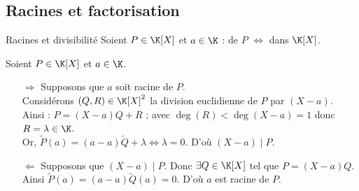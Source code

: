 \documentclass[12pt,a4paper]{report}
\begin{document}
    \subsection{Racines et factorisation}
    
        \begin{theoreme}{Racines et divisibilité}{}
        Soient $P \in \K[X]$ et $a \in \K$ : 
        \center {} de $P$ $\Leftrightarrow$  dans $\K[X]$.
        \end{theoreme}
    
        \begin{demo}
        Soient $P \in \K[X]$ et $a \in \K$.
        \begin{itemize}
            \item[$\Rightarrow$] Supposons que $a$ soit racine de $P$.\\
            Considérons $(Q, R) \in \K[X]^2$ la division euclidienne de $P$ par $(X - a)$.\\
            Ainsi : $P = (X - a)Q + R$ ; avec $\deg(R) < \deg(X - a) = 1$ donc $R = \lambda \in \K$.\\
            Or, $\widetilde{P}(a) = (a - a)\widetilde{Q} + \lambda \Leftrightarrow \lambda = 0$. D'où $(X - a) \mid P$.
            \item[$\Leftarrow$] Supposons que $(X - a) \mid P$. Donc $\exists Q \in \K[X]$ tel que $P = (X-a)Q$.\\
            Ainsi $\widetilde{P}(a) = (a - a)\widetilde{Q}(a) = 0$. D'où $a$ est racine de $P$.\\
        \end{itemize}
        \end{demo}
    
\end{document}
